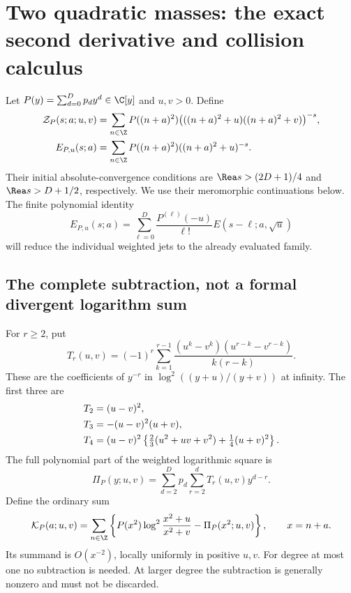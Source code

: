 \section{Two quadratic masses: the exact second derivative and collision calculus}
\label{hqj:sec:collision}

Let $P(y)=\sum_{d=0}^Dp_dy^d\in\C[y]$ and $u,v>0$. Define
\begin{align}
\mathcal Z_P(s;a;u,v)
&=\sum_{n\in\Z}P((n+a)^2)
\bigl(((n+a)^2+u)((n+a)^2+v)\bigr)^{-s},
\label{hqj:eq:product-spectrum}\\
E_{P,u}(s;a)
&=\sum_{n\in\Z}P((n+a)^2)((n+a)^2+u)^{-s}.
\label{hqj:eq:weighted-E}
\end{align}
Their initial absolute-convergence conditions are
$\Rea s>(2D+1)/4$ and $\Rea s>D+1/2$, respectively. We use their
meromorphic continuations below. The finite polynomial identity
\begin{equation}\label{hqj:eq:polynomial-translate}
E_{P,u}(s;a)=\sum_{\ell=0}^D
\frac{P^{(\ell)}(-u)}{\ell!}E(s-\ell;a,\sqrt u)
\end{equation}
will reduce the individual weighted jets to the already evaluated family.

\subsection{The complete subtraction, not a formal divergent logarithm sum}
For $r\ge2$, put
\begin{equation}\label{hqj:eq:Tr}
T_r(u,v)=(-1)^r\sum_{k=1}^{r-1}
\frac{(u^k-v^k)(u^{r-k}-v^{r-k})}{k(r-k)}.
\end{equation}
These are the coefficients of $y^{-r}$ in
$\log^2((y+u)/(y+v))$ at infinity. The first three are
\begin{align}
T_2&=(u-v)^2,\notag\\
T_3&=-(u-v)^2(u+v),\label{hqj:eq:Tlow}\\
T_4&=(u-v)^2\left\{\tfrac23(u^2+uv+v^2)+\tfrac14(u+v)^2\right\}.
\notag
\end{align}
The full polynomial part of the weighted logarithmic square is
\begin{equation}\label{hqj:eq:PiP}
\Pi_P(y;u,v)=\sum_{d=2}^Dp_d\sum_{r=2}^dT_r(u,v)y^{d-r}.
\end{equation}
Define the ordinary sum
\begin{equation}\label{hqj:eq:KP}
\mathcal K_P(a;u,v)=\sum_{n\in\Z}\left\{
P(x^2)\log^2\frac{x^2+u}{x^2+v}-\Pi_P(x^2;u,v)\right\},
\qquad x=n+a.
\end{equation}
Its summand is $O(x^{-2})$, locally uniformly in positive $u,v$.
For degree at most one no subtraction is needed. At larger degree the
subtraction is generally nonzero and must not be discarded.

